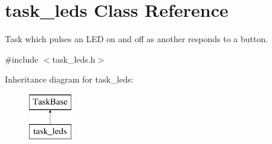 \hypertarget{classtask__leds}{\section{task\-\_\-leds Class Reference}
\label{classtask__leds}
}


Task which pulses an L\-E\-D on and off as another responds to a button.  




{\ttfamily \#include $<$task\-\_\-leds.\-h$>$}

Inheritance diagram for task\-\_\-leds\-:\begin{figure}[H]
\begin{center}
\leavevmode
\includegraphics[height=2.000000cm]{classtask__leds}
\end{center}
\end{figure}
